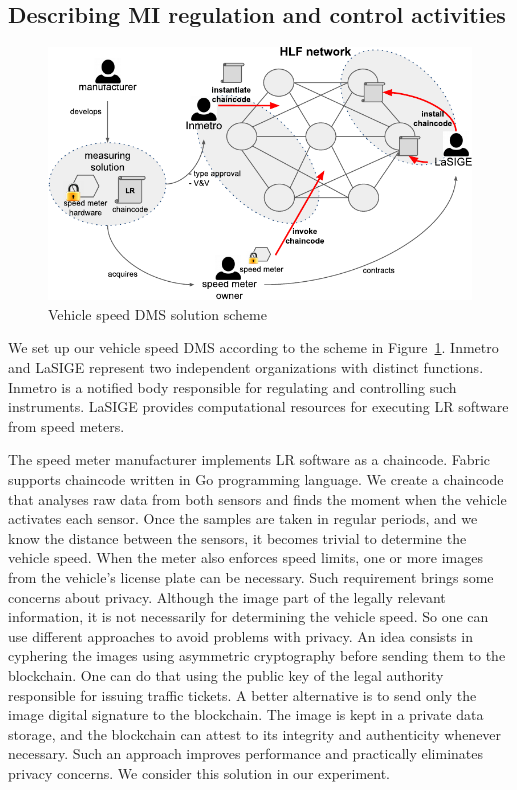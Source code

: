 \documentclass[journal]{IEEEtran}
\begin{document}
\subsection{Describing MI regulation and control activities}

\begin{figure}[!t]
\centering
\includegraphics[width=.5\textwidth]{hlfscheme} %
\caption{Vehicle speed DMS solution scheme}
\label{f:scheme}
\end{figure}

We set up our vehicle speed DMS according to the scheme in Figure~\ref{f:scheme}.
Inmetro and LaSIGE represent two independent organizations with distinct functions.
Inmetro is a notified body responsible for regulating and controlling such instruments.
LaSIGE provides computational resources for executing LR software from speed meters.

The speed meter manufacturer implements LR software as a chaincode. 
Fabric supports chaincode written in Go programming language.
We create a chaincode that analyses raw data from both sensors and finds the moment when the vehicle activates each sensor.
Once the samples are taken in regular periods, and we know the distance between the sensors, it becomes trivial to determine the vehicle speed.
When the meter also enforces speed limits, one or more images from the vehicle's license plate can be necessary.
Such requirement brings some concerns about privacy.
Although the image part of the legally relevant information, it is not necessarily for determining the vehicle speed.
So one can use different approaches to avoid problems with privacy.
An idea consists in cyphering the images using asymmetric cryptography before sending them to the blockchain.
One can do that using the public key of the legal authority responsible for issuing traffic tickets.
A better alternative is to send only the image digital signature to the blockchain.
The image is kept in a private data storage, and the blockchain can attest to its integrity and authenticity whenever necessary.
Such an approach improves performance and practically eliminates privacy concerns.
We consider this solution in our experiment.
\end{document}
